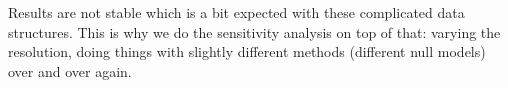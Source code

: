 {Results are not stable which is a bit expected with these complicated data structures. This is why we do the sensitivity analysis on top of that: varying the resolution, doing things with slightly different methods (different null models) over and over again. 
}
\clearpage

